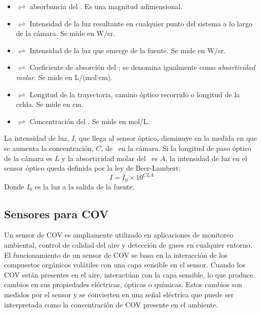 \begin{itemize}
  \item[$A$] $\rightleftharpoons$ absorbancia del \CO. Es una magnitud adimensional.
  \item[$I_a$] $\rightleftharpoons$ Intensidad de la luz resultante en cualquier punto del sistema a lo largo de la cámara. Se mide en W/sr.
  \item[$I_f$] $\rightleftharpoons$ Intensidad de la luz que emerge de la fuente. Se mide en W/sr.
  \item[$a$] $\rightleftharpoons$ Coeficiente de absorción del \CO; se denomina igualmente como \emph{absortividad molar}. Se mide en L/(mol$\cdot$cm).
  \item[$x$] $\rightleftharpoons$ Longitud de la trayectoria, camino óptico recorrido o longitud de la celda. Se mide en cm.
  \item[$C$] $\rightleftharpoons$ Concentración del \CO. Se mide en mol/L.
\end{itemize}

La intensidad de luz, $I$, que llega al sensor óptico, disminuye en la medida en que se aumenta la concentración, $C$, de \CO\ en la cámara. Si la longitud de paso óptico de la cámara es $L$ y la absortividad molar del \CO\ es $A$, la intensidad de luz en el sensor óptico queda definida por la ley de Beer-Lambert:
\begin{equation*}
  I=I_0\times 10^{CLA}
\end{equation*}
Donde $I_0$ es la luz a la salida de la fuente.

\subsection{Sensores para COV}
Un sensor de COV es ampliamente utilizado en aplicaciones de monitoreo ambiental, control de calidad del aire y detección de gases en cualquier entorno.
El funcionamiento de un sensor de COV se basa en la interacción de los compuestos orgánicos volátiles con una capa sensible en el sensor. Cuando los COV están presentes en el aire, interactúan con la capa sensible, lo que produce cambios en sus propiedades eléctricas, ópticas o químicas. Estos cambios son medidos por el sensor y se convierten en una señal eléctrica que puede ser interpretada como la concentración de COV presente en el ambiente.


